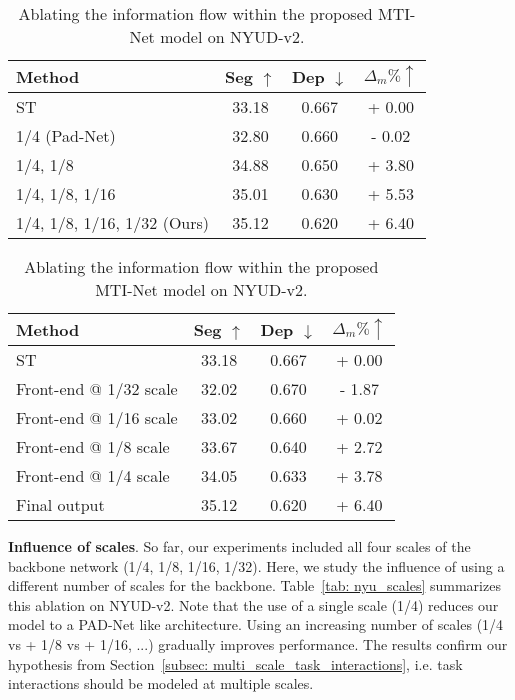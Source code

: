 \documentclass[runningheads]{llncs}
\begin{document}
\begin{table}[t]
\begin{minipage}[t]{.45\linewidth}
\caption{Influence of using a different number of scales for the backbone network on NYUD-v2.}
\label{tab: nyu_scales}
\centering
\tiny{
\begin{tabular}{|l|c|c|c|}
\hline
Method & Seg $\uparrow$ & Dep $\downarrow$ & $\Delta_{m} \% \uparrow$ \\
\hline
ST & 33.18 & 0.667 & + 0.00 \\
1/4 (Pad-Net) & 32.80 & 0.660 & - 0.02 \\
1/4, 1/8 & 34.88 & 0.650 & + 3.80 \\
1/4, 1/8, 1/16 & 35.01 & 0.630 & + 5.53 \\
1/4, 1/8, 1/16, 1/32 (Ours) & 35.12 & 0.620 & + 6.40 \\
\hline
\end{tabular}}
\end{minipage}
\hspace*{.03\linewidth}
\begin{minipage}[t]{.45\linewidth}
\caption{Ablating the information flow within the proposed MTI-Net model on NYUD-v2.}
\label{tab: nyu_frontend}
\centering
\tiny{
\begin{tabular}{|l|c|c|c|}
\hline
Method & Seg $\uparrow$ & Dep $\downarrow$ & $\Delta_{m} \% \uparrow$ \\
\hline
ST & 33.18 & 0.667 & + 0.00 \\
Front-end @ 1/32 scale & 32.02 & 0.670 & - 1.87 \\
Front-end @ 1/16 scale & 33.02 & 0.660 & + 0.02 \\
Front-end @ 1/8 scale  & 33.67 & 0.640 & + 2.72 \\
Front-end @ 1/4 scale & 34.05 & 0.633 & + 3.78 \\
Final output & 35.12 & 0.620 & + 6.40 \\
\hline
\end{tabular}}
\end{minipage}
\end{table}

\noindent\textbf{Influence of scales}.
So far, our experiments included all four scales of the backbone network (1/4, 1/8, 1/16, 1/32). Here, we study the influence of using a different number of scales for the backbone. Table~\ref{tab: nyu_scales} summarizes this ablation on NYUD-v2. Note that the use of a single scale (1/4) reduces our model to a PAD-Net like architecture. Using an increasing number of scales (1/4 vs + 1/8 vs + 1/16, ...) gradually improves performance. The results confirm our hypothesis from Section~\ref{subsec: multi_scale_task_interactions}, i.e. task interactions should be modeled at multiple scales. 
\end{document}
